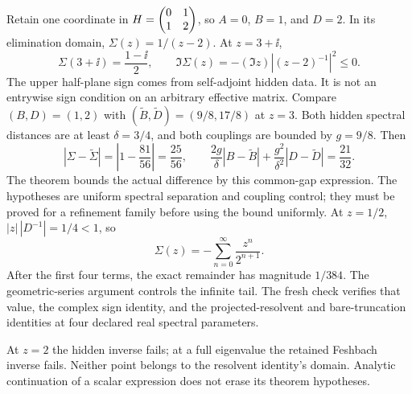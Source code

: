 Retain one coordinate in $H=\begin{pmatrix}0&1\\1&2\end{pmatrix}$, so $A=0$, $B=1$, and $D=2$. In its elimination domain, $\Sigma(z)=1/(z-2)$. At $z=3+\ii$,
\[
\Sigma(3+\ii)=\frac{1-\ii}{2},\qquad
\Im\Sigma(z)=-(\Im z)\left|(z-2)^{-1}\right|^2\leq0.
\]
The upper half-plane sign comes from self-adjoint hidden data. It is not an entrywise sign condition on an arbitrary effective matrix.
Compare $(B,D)=(1,2)$ with $(\widetilde B,\widetilde D)=(9/8,17/8)$ at $z=3$. Both hidden spectral distances are at least $\delta=3/4$, and both couplings are bounded by $g=9/8$. Then
\[
|\Sigma-\widetilde\Sigma|=\left|1-\frac{81}{56}\right|=\frac{25}{56},
\qquad
\frac{2g}{\delta}|B-\widetilde B|
+\frac{g^2}{\delta^2}|D-\widetilde D|=\frac{21}{32}.
\]
The theorem bounds the actual difference by this common-gap expression. The hypotheses are uniform spectral separation and coupling control; they must be proved for a refinement family before using the bound uniformly.
At $z=1/2$, $|z|\,|D^{-1}|=1/4<1$, so
\[
\Sigma(z)=-\sum_{n=0}^{\infty}\frac{z^n}{2^{n+1}}.
\]
After the first four terms, the exact remainder has magnitude $1/384$. The geometric-series argument controls the infinite tail. The fresh check verifies that value, the complex sign identity, and the projected-resolvent and bare-truncation identities at four declared real spectral parameters.

At $z=2$ the hidden inverse fails; at a full eigenvalue the retained Feshbach inverse fails. Neither point belongs to the resolvent identity's domain. Analytic continuation of a scalar expression does not erase its theorem hypotheses.

